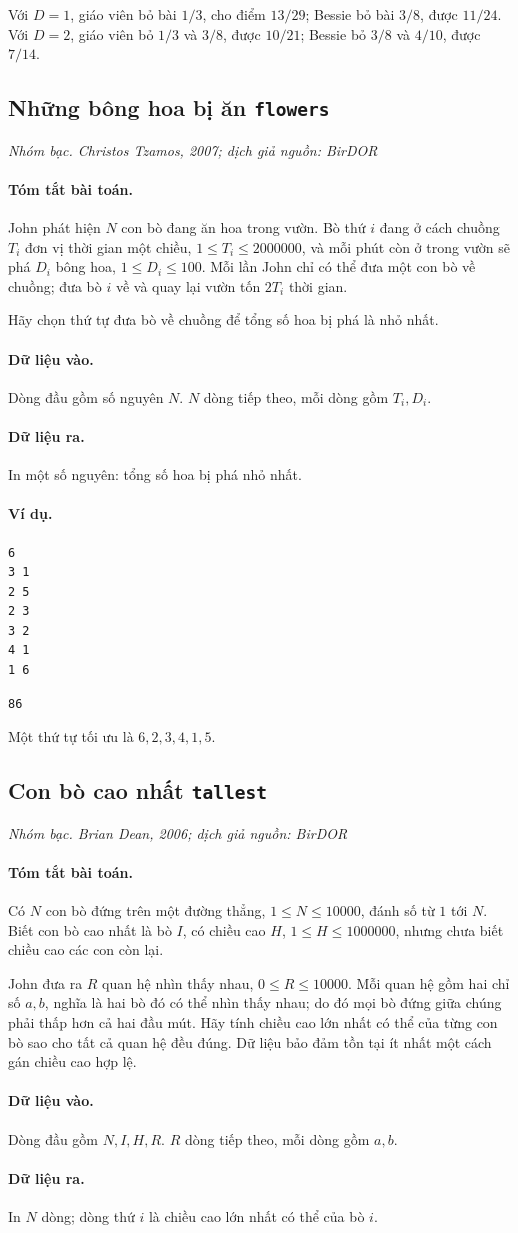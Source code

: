 \documentclass[11pt]{article}
\newcommand{\problem}[4]{%
  \subsection[#1 (#2)]{#1 \hfill {\normalsize\texttt{#2}}}%
  \noindent\textit{#3. #4}\par\smallskip
}
\newcommand{\iosec}[1]{\paragraph{#1}}
\begin{document}
Với \(D=1\), giáo viên bỏ bài \(1/3\), cho điểm \(13/29\); Bessie bỏ bài
\(3/8\), được \(11/24\). Với \(D=2\), giáo viên bỏ \(1/3\) và \(3/8\), được
\(10/21\); Bessie bỏ \(3/8\) và \(4/10\), được \(7/14\).

\problem{Những bông hoa bị ăn}{flowers}{Nhóm bạc}{Christos Tzamos, 2007; dịch giả nguồn: BirDOR}

\iosec{Tóm tắt bài toán.}
John phát hiện \(N\) con bò đang ăn hoa trong vườn. Bò thứ \(i\) đang ở cách
chuồng \(T_i\) đơn vị thời gian một chiều, \(1\le T_i\le 2000000\), và mỗi
phút còn ở trong vườn sẽ phá \(D_i\) bông hoa, \(1\le D_i\le 100\). Mỗi lần
John chỉ có thể đưa một con bò về chuồng; đưa bò \(i\) về và quay lại vườn
tốn \(2T_i\) thời gian.

Hãy chọn thứ tự đưa bò về chuồng để tổng số hoa bị phá là nhỏ nhất.

\iosec{Dữ liệu vào.}
Dòng đầu gồm số nguyên \(N\). \(N\) dòng tiếp theo, mỗi dòng gồm \(T_i,D_i\).

\iosec{Dữ liệu ra.}
In một số nguyên: tổng số hoa bị phá nhỏ nhất.

\iosec{Ví dụ.}
\begin{verbatim}
6
3 1
2 5
2 3
3 2
4 1
1 6
\end{verbatim}

\begin{verbatim}
86
\end{verbatim}

Một thứ tự tối ưu là \(6,2,3,4,1,5\).

\problem{Con bò cao nhất}{tallest}{Nhóm bạc}{Brian Dean, 2006; dịch giả nguồn: BirDOR}

\iosec{Tóm tắt bài toán.}
Có \(N\) con bò đứng trên một đường thẳng, \(1\le N\le 10000\), đánh số từ
\(1\) tới \(N\). Biết con bò cao nhất là bò \(I\), có chiều cao \(H\),
\(1\le H\le 1000000\), nhưng chưa biết chiều cao các con còn lại.

John đưa ra \(R\) quan hệ nhìn thấy nhau, \(0\le R\le 10000\). Mỗi quan hệ
gồm hai chỉ số \(a,b\), nghĩa là hai bò đó có thể nhìn thấy nhau; do đó mọi
bò đứng giữa chúng phải thấp hơn cả hai đầu mút. Hãy tính chiều cao lớn nhất
có thể của từng con bò sao cho tất cả quan hệ đều đúng. Dữ liệu bảo đảm tồn
tại ít nhất một cách gán chiều cao hợp lệ.

\iosec{Dữ liệu vào.}
Dòng đầu gồm \(N,I,H,R\). \(R\) dòng tiếp theo, mỗi dòng gồm \(a,b\).

\iosec{Dữ liệu ra.}
In \(N\) dòng; dòng thứ \(i\) là chiều cao lớn nhất có thể của bò \(i\).
\end{document}
